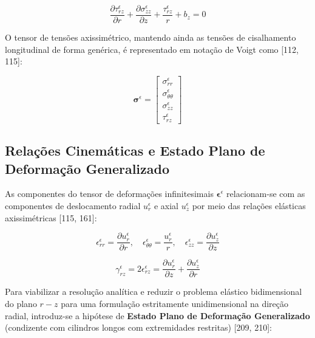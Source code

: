 \begin{equation}
  \frac{\partial \tau_{rz}^\epsilon}{\partial r} + \frac{\partial \sigma_{zz}^\epsilon}{\partial z} + \frac{\tau_{rz}^\epsilon}{r} + b_z = 0
  \label{eq:equilibrium_axi_z}
\end{equation}

O tensor de tensões axissimétrico, mantendo ainda as tensões de cisalhamento longitudinal de forma genérica, é representado em notação de Voigt como [112, 115]:

\begin{equation}
  \boldsymbol{\sigma}^\epsilon = \begin{bmatrix}
    \sigma_{rr}^\epsilon \\
    \sigma_{\theta\theta}^\epsilon \\
    \sigma_{zz}^\epsilon \\
    \tau_{rz}^\epsilon
  \end{bmatrix}
  \label{eq:voigt_stress_axi}
\end{equation}

\subsection{Relações Cinemáticas e Estado Plano de Deformação Generalizado}

As componentes do tensor de deformações infinitesimais $\mathbf{\epsilon}^\epsilon$ relacionam-se com as componentes de deslocamento radial $u_r^\epsilon$ e axial $u_z^\epsilon$ por meio das relações elásticas axissimétricas [115, 161]:

\begin{equation}
  \epsilon_{rr}^\epsilon = \frac{\partial u_r^\epsilon}{\partial r}, \quad \epsilon_{\theta\theta}^\epsilon = \frac{u_r^\epsilon}{r}, \quad \epsilon_{zz}^\epsilon = \frac{\partial u_z^\epsilon}{\partial z}
  \label{eq:strains_normal}
\end{equation}

\begin{equation}
  \gamma_{rz}^\epsilon = 2\epsilon_{rz}^\epsilon = \frac{\partial u_r^\epsilon}{\partial z} + \frac{\partial u_z^\epsilon}{\partial r}
  \label{eq:strain_shear}
\end{equation}

Para viabilizar a resolução analítica e reduzir o problema elástico bidimensional do plano $r-z$ para uma formulação estritamente unidimensional na direção radial, introduz-se a hipótese de \textbf{Estado Plano de Deformação Generalizado} (condizente com cilindros longos com extremidades restritas) [209, 210]:

